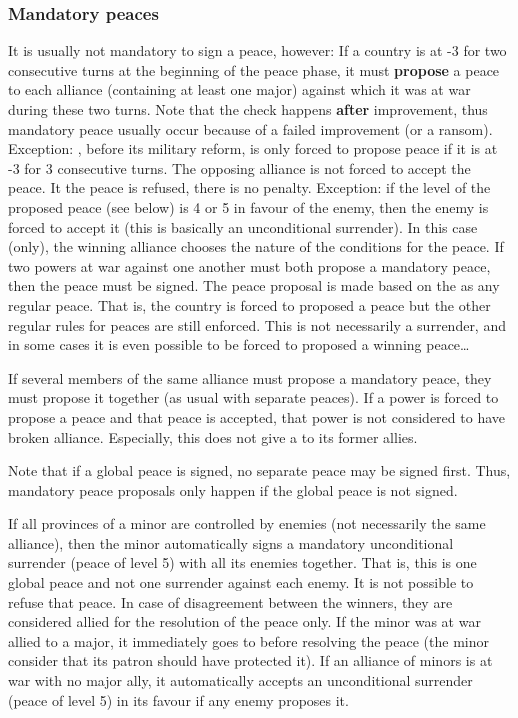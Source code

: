 \subsubsection{Mandatory peaces}\label{chPeace:Mandatory peaces}
 It is usually not mandatory to sign a
peace, however:
\bparag If a country is at -3 \STAB for two consecutive turns at the beginning
of the peace phase, it must \textbf{propose} a peace to each alliance
(containing at least one major) against which it was at war during these two
turns. Note that the check happens \textbf{after} \STAB improvement, thus
mandatory peace usually occur because of a failed improvement (or a ransom).
\bparag Exception: \RUS, before its military reform, is only forced to propose
peace if it is at -3 \STAB for 3 consecutive turns.
\bparag The opposing alliance is not forced to accept the peace. It the peace
is refused, there is no penalty.
\bparag Exception: if the level of the proposed peace (see below) is 4 or 5 in
favour of the enemy, then the enemy is forced to accept it (this is basically
an unconditional surrender). In this case (only), the winning alliance chooses
the nature of the conditions for the peace.
\bparag If two powers at war against one another must both propose a mandatory
peace, then the peace must be signed.
\bparag The peace proposal is made based on the  as
any regular peace. That is, the country is forced to proposed a peace but the
other regular rules for peaces are still enforced. This is not necessarily a
surrender, and in some cases it is even possible to be forced to proposed a
winning peace\ldots

\bparag If several members of the same alliance must propose a mandatory
peace, they must propose it together (as usual with separate peaces).
\bparag If a power is forced to propose a peace and that peace is accepted,
that power is not considered to have broken alliance.
\bparag Especially, this does not give a \CB to its former allies.

 Note that if a global peace is
signed, no separate peace may be signed first. Thus, mandatory peace proposals
only happen if the global peace is not signed.

\label{chPeace:Mandatory peace minors}
\bparag If all provinces of a minor are controlled by enemies (not necessarily
the same alliance), then the minor automatically signs a mandatory
unconditional surrender (peace of level 5) with all its enemies together. That
is, this is one global peace and not one surrender against each enemy.
\bparag It is not possible to refuse that peace. In case of disagreement
between the winners, they are considered allied for the resolution of the
peace only.
\bparag If the minor was at war allied to a major, it immediately goes to
\Neutral before resolving the peace (the minor consider that its patron should
have protected it).
\bparag If an alliance of minors is at war with no major ally, it
automatically accepts an unconditional surrender (peace of level 5) in its
favour if any enemy proposes it.

